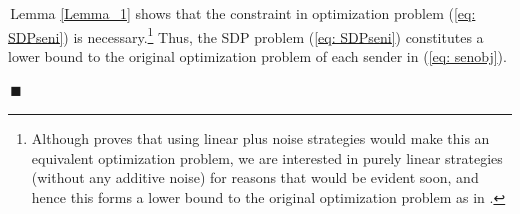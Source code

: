 \documentclass[12pt,journal,onecolumn]{IEEEtran}
\newenvironment{Proof}[1]{\medskip\par\noindent{\bf Proof:\,}\,#1}{{\mbox{\,$\blacksquare$}\par}}
\newcommand{\rknote}[1]{\noindent{\leavevmode\color{red}[Raj -- #1]}}
\begin{document}
 \begin{Proof} %
Lemma \ref{Lemma_1} shows that the constraint in optimization problem  (\ref{eq: SDPseni}) is necessary.\footnote{Although \cite{9222530} proves that using linear plus noise strategies would make this an equivalent optimization problem, we are interested in purely linear  strategies (without any additive noise) for reasons that would be evident soon, and hence this forms a lower bound to the original optimization problem as in \cite{sayin2019hierarchical}.} %
Thus, the SDP problem (\ref{eq: SDPseni}) constitutes a lower bound to the original optimization problem of each sender in (\ref{eq: senobj}). 
 \end{Proof}
\end{document}
